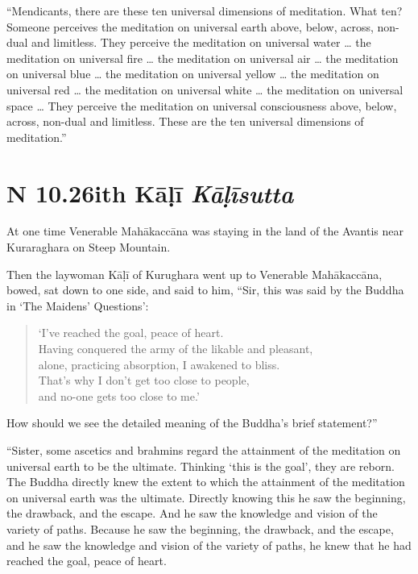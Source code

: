\documentclass[12pt,openany]{book}%
\newcommand*{\suttatitleacronym}[1]{\smaller[2]{#1}\vspace*{.3em}}
\newcommand*{\suttatitletranslation}[1]{\linebreak{#1}}
\newcommand*{\suttatitleroot}[1]{\linebreak\smaller[2]\itshape{#1}}
\newcommand*{\tocacronym}[1]{\hspace*{-3.3em}{#1}\quad}
\newcommand*{\toctranslation}[1]{#1}
\newcommand*{\tocroot}[1]{(\textit{#1})}
\begin{document}
“Mendicants, there are these ten universal dimensions of meditation. What ten? Someone perceives the meditation on universal earth above, below, across, non-dual and limitless. They perceive the meditation on universal water … the meditation on universal fire … the meditation on universal air … the meditation on universal blue … the meditation on universal yellow … the meditation on universal red … the meditation on universal white … the meditation on universal space … They perceive the meditation on universal consciousness above, below, across, non-dual and limitless. These are the ten universal dimensions of meditation.” 

%
\section*{{\suttatitleacronym AN 10.26}{\suttatitletranslation With Kāḷī }{\suttatitleroot Kāḷīsutta}}
\addcontentsline{toc}{section}{\tocacronym{AN 10.26} \toctranslation{With Kāḷī } \tocroot{Kāḷīsutta}}

At one time Venerable \textsanskrit{Mahākaccāna} was staying in the land of the Avantis near Kuraraghara on Steep Mountain. 

Then the laywoman \textsanskrit{Kāḷī} of Kurughara went up to Venerable \textsanskrit{Mahākaccāna}, bowed, sat down to one side, and said to him, “Sir, this was said by the Buddha in ‘The Maidens’ Questions’: 

\begin{verse}%
‘I’ve reached the goal, peace of heart. \\
Having conquered the army of the likable and pleasant, \\
alone, practicing absorption, I awakened to bliss. \\
That’s why I don’t get too close to people, \\
and no-one gets too close to me.’ 

%
\end{verse}

How should we see the detailed meaning of the Buddha’s brief statement?” 

“Sister, some ascetics and brahmins regard the attainment of the meditation on universal earth to be the ultimate. Thinking ‘this is the goal’, they are reborn. The Buddha directly knew the extent to which the attainment of the meditation on universal earth was the ultimate. Directly knowing this he saw the beginning, the drawback, and the escape. And he saw the knowledge and vision of the variety of paths. Because he saw the beginning, the drawback, and the escape, and he saw the knowledge and vision of the variety of paths, he knew that he had reached the goal, peace of heart. 
\end{document}
